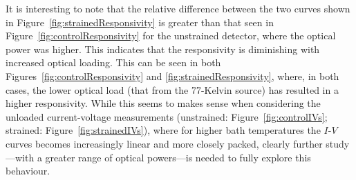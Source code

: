 It is interesting to note that the relative difference between the two curves shown in Figure~\ref{fig:strainedResponsivity} is greater than that seen in Figure~\ref{fig:controlResponsivity} for the unstrained detector, where the optical power was higher. This indicates that the responsivity is diminishing with increased optical loading. This can be seen in both Figures~\ref{fig:controlResponsivity} and \ref{fig:strainedResponsivity}, where, in both cases, the lower optical load (that from the 77-Kelvin source) has resulted in a higher responsivity. While this seems to makes sense when considering the unloaded current-voltage measurements (unstrained: Figure~\ref{fig:controlIVs}; strained: Figure~\ref{fig:strainedIVs}), where for higher bath temperatures the $I$-$V$ curves becomes increasingly linear and more closely packed, clearly further study---with a greater range of optical powers---is needed to fully explore this behaviour. 
%
